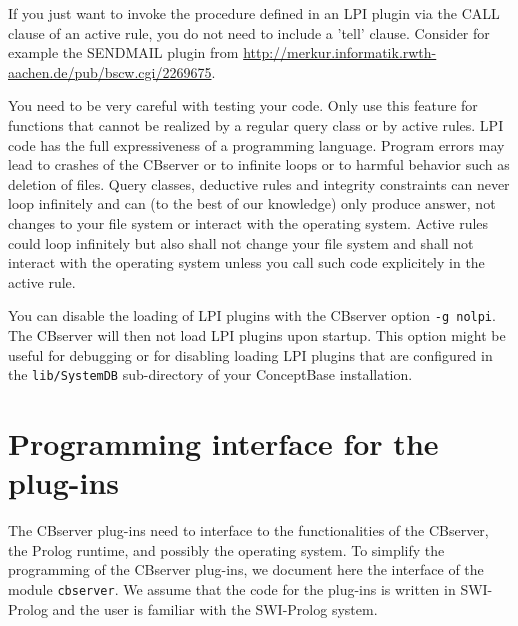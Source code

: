 If you just want to invoke the procedure defined in an LPI plugin via the CALL clause of an active rule,
you  do not need to include a 'tell' clause. Consider for example the SENDMAIL plugin from
\url{http://merkur.informatik.rwth-aachen.de/pub/bscw.cgi/2269675}.

You need to be very careful with testing your code. Only use this feature for functions
that cannot be realized by a regular query class or by active rules. LPI code has the 
full expressiveness of a programming language. Program errors may lead to crashes of the CBserver
or to infinite loops or to harmful behavior such as deletion of files. 
Query classes, deductive rules and integrity constraints can never loop infinitely 
and can (to the best of our knowledge) only produce answer, not changes to your file system
or interact with the operating system.
Active rules could loop infinitely but also shall not change your file system and shall not 
interact with the operating system unless you call such code explicitely in the active rule.

You can disable the loading of LPI plugins with the CBserver option {\tt -g nolpi}. The
CBserver will then not load LPI plugins upon startup. This option might be useful for
debugging or for disabling loading LPI plugins that are configured in the {\tt lib/SystemDB}
sub-directory of your ConceptBase installation.



\section{Programming interface for the plug-ins}
\label{sec:cbserver-extensions}
The CBserver plug-ins need to interface to the functionalities of the CBserver, the Prolog
runtime, and possibly the operating system. To simplify the programming of the CBserver
plug-ins, we document here the interface of the module {\tt cbserver}. We assume
that the code for the plug-ins is written in SWI-Prolog and the user is familiar with
the SWI-Prolog system.

